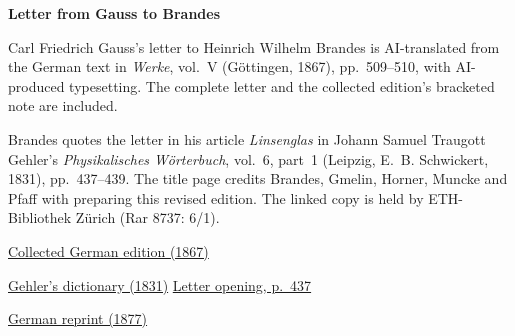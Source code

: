 \clearpage
\thispagestyle{empty}
\begin{center}\Large\textbf{Letter from Gauss to Brandes}\end{center}

Carl Friedrich Gauss’s letter to Heinrich Wilhelm Brandes is AI-translated from the German text in \textit{Werke}, vol.~V (Göttingen, 1867), pp.~509--510, with AI-produced typesetting. The complete letter and the collected edition’s bracketed note are included.

Brandes quotes the letter in his article \textit{Linsenglas} in Johann Samuel Traugott Gehler’s \textit{Physikalisches Wörterbuch}, vol.~6, part~1 (Leipzig, E.~B. Schwickert, 1831), pp.~437--439. The title page credits Brandes, Gmelin, Horner, Muncke and Pfaff with preparing this revised edition. The linked copy is held by ETH-Bibliothek Zürich (Rar 8737: 6/1).

\medskip\noindent
\href{https://gdz.sub.uni-goettingen.de/id/PPN236006339}{Collected German edition (1867)}\par
\noindent\href{https://www.e-rara.ch/zut/content/titleinfo/2538108}{Gehler’s dictionary (1831)}\quad
\href{https://www.e-rara.ch/i3f/v20/2538554/full/1300,/0/default.jpg}{Letter opening, p.~437}\par
\noindent\href{https://doi.org/10.1007/978-3-642-49319-5_25}{German reprint (1877)}
\clearpage
